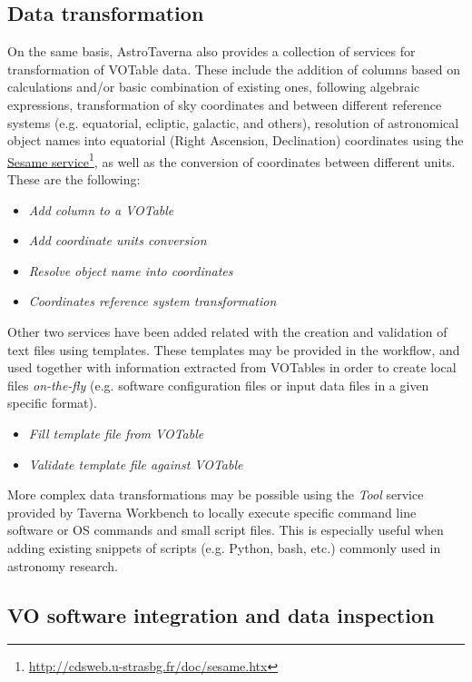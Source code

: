 \documentclass[final,authoryear,5p,times,twocolumn]{elsarticle}
\newcommand{\urlsamefont}[1]{\urlstyle{same}\url{#1}}
\newcommand{\hrefnote}[2]{\href{#1}{#2}\footnote{\urlsamefont{#1}}}
\begin{document}
\subsection{Data transformation}
\label{DataTransformation}

On the same basis, AstroTaverna also provides a collection of services for transformation of VOTable data. These include the addition of columns based on calculations and/or basic combination of existing ones, following algebraic expressions, transformation of sky coordinates and between different reference systems (e.g. equatorial, ecliptic, galactic, and others), resolution of astronomical object names into equatorial (Right Ascension, Declination) coordinates using the \hrefnote{http://cdsweb.u-strasbg.fr/doc/sesame.htx}{Sesame service}, as well as the conversion of coordinates between different units. These are the following:

\begin{itemize}
\item \textit{Add column to a VOTable}
\item \textit{Add coordinate units conversion}
\item \textit{Resolve object name into coordinates} 
\item \textit{Coordinates reference system transformation}
\end{itemize}

Other two services have been added related with the creation and validation of text files using templates. These templates may be provided in the workflow, and used together with information extracted from VOTables in order to create local files \textit{on-the-fly} (e.g. software configuration files or input data files in a given specific format).

\begin{itemize}
\item \textit{Fill template file from VOTable}
\item \textit{Validate template file against VOTable}
\end{itemize}

More complex data transformations may be possible using the \textit{Tool} service provided by Taverna Workbench to locally execute specific command line software or OS commands and small script files. This is especially useful when adding existing snippets of scripts (e.g. Python, bash, etc.) commonly used in astronomy research.  

\subsection{VO software integration and data inspection}
\label{VOApps}
\end{document}
